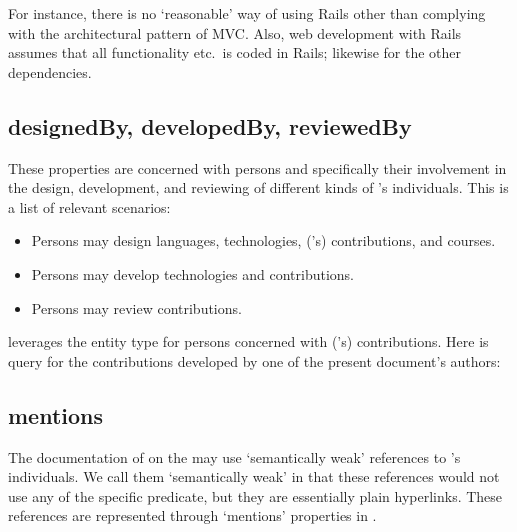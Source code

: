 

\noindent
For instance, there is no `reasonable' way of using Rails other than
complying with the architectural pattern of MVC. Also, web development
with Rails assumes that all functionality etc.\ is coded in Rails;
likewise for the other dependencies.


\subsection{designedBy, developedBy, reviewedBy}

These properties are concerned with persons and specifically
their involvement in the design, development, and reviewing of
different kinds of \solasote{}'s individuals. This is a list of
relevant scenarios:
%
\begin{itemize}
\item Persons may design languages, technologies, (\ooo{}'s) contributions, and
  courses.
\item Persons may develop technologies and contributions.
\item Persons may review contributions.
\end{itemize}
%
\solasote{} leverages the entity type  for
persons concerned with (\ooo{}'s) contributions. Here is query for the
contributions developed by one of the present document's authors:




\subsection{mentions}

The documentation of \solasote{} on the  may use
`semantically weak' references to \solasote's individuals. We call
them `semantically weak' in that these references would not use any of
the specific predicate, but they are essentially plain
hyperlinks. These references are represented through `mentions'
properties in \solasote. 


